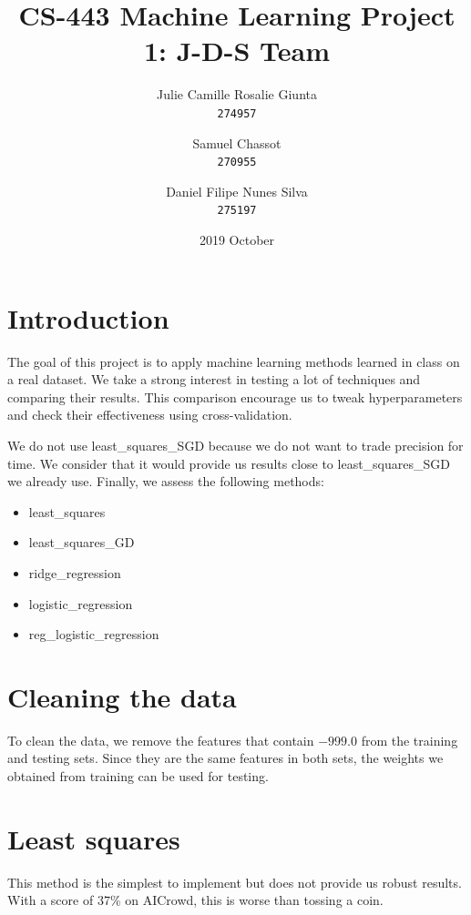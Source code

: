 \documentclass[11pt, a4paper, twocolumn]{article}
\begin{document}
\date{2019 October}
\title{CS-443 Machine Learning Project 1: J-D-S Team}
\author{
  Julie Camille Rosalie Giunta\\
  \texttt{274957}
  \and
  Samuel Chassot\\
  \texttt{270955}
  \and
  Daniel Filipe Nunes Silva\\
  \texttt{275197}
}

\maketitle
\clearpage

\section{Introduction}
The goal of this project is to apply machine learning
methods learned in class on a real dataset. We take a
strong interest in testing a lot of techniques and
comparing their results. This comparison encourage us to
tweak hyperparameters and check their effectiveness using cross-validation.

We do not use least\_squares\_SGD because we do not want
to trade precision for time. We consider
that it would provide us results close to
least\_squares\_SGD we already use. Finally, we assess the following
methods:

\begin{itemize}
  \setlength{\itemsep}{1pt}
  \setlength{\parskip}{0pt}
  \setlength{\parsep}{0pt}
  \item least\_squares
  \item least\_squares\_GD 
  \item ridge\_regression
  \item logistic\_regression
  \item reg\_logistic\_regression
\end{itemize}

\section{Cleaning the data}
To clean the data, we remove the features
that contain $-999.0$ from the training and testing sets. 
Since they are the same features in both sets, 
the weights we obtained from training can be used for testing.

\section{Least squares}
This method is the simplest to implement but does not
provide us robust results. With a score of 37\% on
AICrowd, this is worse than tossing a coin.
\end{document}
